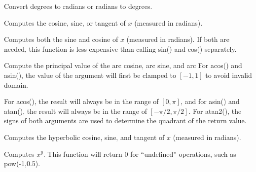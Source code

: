 \documentclass[11pt,letterpaper]{book}
\begin{document}
\medskip

 
Convert degrees to radians or radians to degrees.
\apiend


  
Computes the cosine, sine, or tangent of $x$ (measured in radians).
\apiend

Computes both the sine and cosine of $x$ (measured in radians).  If both
are needed, this function is less expensive than calling {\cf sin()} and
{\cf cos()} separately.
\apiend

   
Compute the principal value of the arc cosine, arc sine, and arc
For {\cf acos()} and {\cf asin()}, the value of the argument
will first be clamped to $[-1,1]$ to avoid invalid domain.

For {\cf acos()}, the result will always be in the range of $[0, \pi]$,
and for {\cf asin()} and {\cf atan()}, the result will always be in the
range of $[-\pi/2, \pi/2]$.  For {\cf atan2()}, the signs of both
arguments are used to determine the quadrant of the return value.
\apiend

  
Computes the hyperbolic cosine, sine, and tangent of $x$ (measured in radians).
\apiend

Computes $x^y$.  This function will return 0 for ``undefined''
operations, such as {\cf pow(-1,0.5)}.
\apiend
\end{document}
